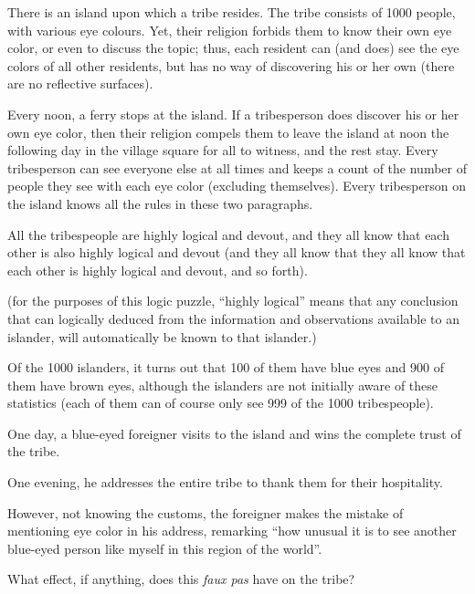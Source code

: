 \documentclass[11pt]{exam}
\theoremstyle{remark}
\numberwithin{equation}{section}
\begin{document}
\begin{questions}




\newpage 

\question There is an island upon which a tribe resides. The tribe consists of 1000 people, with various eye colours. Yet, their religion forbids them to know their own eye color, or even to discuss the topic; thus, each resident can (and does) see the eye colors of all other residents, but has no way of discovering his or her own (there are no reflective surfaces). 

Every noon, a ferry stops at the island. If a tribesperson does discover his or her own eye color, then their religion compels them to leave the island at noon the following day in the village square for all to witness, and the rest stay. Every tribesperson can see everyone else at all times and keeps a count of the number of people they see with each eye color (excluding themselves). Every tribesperson on the island knows all the rules in these two paragraphs.

All the tribespeople are highly logical and devout, and they all know that each other is also highly logical and devout (and they all know that they all know that each other is highly logical and devout, and so forth).

(for the purposes of this logic puzzle, ``highly logical'' means that any conclusion that can logically deduced from the information and observations available to an islander, will automatically be known to that islander.)

Of the 1000 islanders, it turns out that 100 of them have blue eyes and 900 of them have brown eyes, although the islanders are not initially aware of these statistics (each of them can of course only see 999 of the 1000 tribespeople).

One day, a blue-eyed foreigner visits to the island and wins the complete trust of the tribe.

One evening, he addresses the entire tribe to thank them for their hospitality.

However, not knowing the customs, the foreigner makes the mistake of mentioning eye color in his address, remarking ``how unusual it is to see another blue-eyed person like myself in this region of the world''.

What effect, if anything, does this \emph{faux pas} have on the tribe?

\end{questions}
\newpage
\phantom{some}
\end{document}
